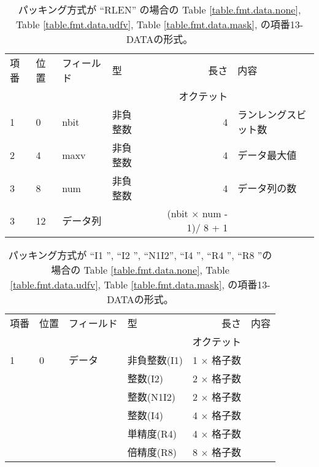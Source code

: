\begin{table}[htp]
 \begin{center}
 \begin{tabular}{ll|llrl}
 \hline
 項番 & 位置 & フィールド & 型 & 長さ & 内容 \\
      &      &            & \multicolumn{2}{r}{オクテット} &  \\
 \hline
   1  &  0   & nbit & 非負整数 & 4 &  ランレングスビット数\\
   2  &  4   & maxv  & 非負整数 & 4 &  データ最大値\\
   3  &  8   & num & 非負整数 & 4 & データ列の数　\\
   3  &  12  & データ列    &    &  (nbit $\times$ num - 1)/ 8  + 1 & 
  \\ 
  \hline
 \end{tabular}
 \end{center}
 \caption{%
  パッキング方式が ``RLEN'' の場合の
 Table \ref{table.fmt.data.none},
 Table \ref{table.fmt.data.udfv},
 Table \ref{table.fmt.data.mask}, の項番13-DATAの形式。
 }
 \label{table.fmt.data.rlen}
\end{table}

\begin{table}[htp]
 \begin{center}
 \begin{tabular}{ll|llrl}
 \hline
 項番 & 位置 & フィールド & 型 & 長さ & 内容 \\
      &      &            & \multicolumn{2}{r}{オクテット} &  \\
 \hline
   1  &  0  & データ    & 非負整数(I1)  & 1 $\times$ 格子数 & \\  
      &     &           & 整数(I2)      & 2 $\times$ 格子数 & \\  
      &     &           & 整数(N1I2)    & 2 $\times$ 格子数 & \\  
      &     &           & 整数(I4)      & 4 $\times$ 格子数 & \\  
      &     &           & 単精度(R4)      & 4 $\times$ 格子数 & \\  
      &     &           & 倍精度(R8)      & 8 $\times$ 格子数 & \\  
  \hline
 \end{tabular}
 \end{center}
 \caption{%
  パッキング方式が ``I1  '', ``I2  '', ``N1I2'', ``I4  '', ``R4  '', 
 ``R8  ''の場合の
 Table \ref{table.fmt.data.none},
 Table \ref{table.fmt.data.udfv},
 Table \ref{table.fmt.data.mask}, の項番13-DATAの形式。
 }
 \label{table.fmt.data.r4}
\end{table}

